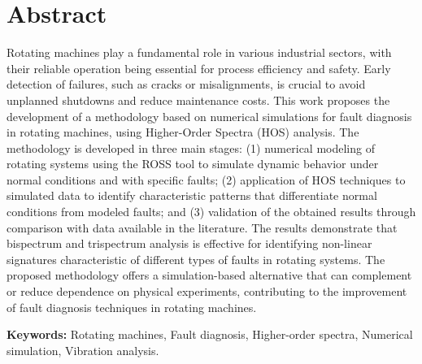 
\chapter*{Abstract}

Rotating machines play a fundamental role in various industrial sectors, with their reliable operation being essential for process efficiency and safety. Early detection of failures, such as cracks or misalignments, is crucial to avoid unplanned shutdowns and reduce maintenance costs. This work proposes the development of a methodology based on numerical simulations for fault diagnosis in rotating machines, using Higher-Order Spectra (HOS) analysis. The methodology is developed in three main stages: (1) numerical modeling of rotating systems using the ROSS tool to simulate dynamic behavior under normal conditions and with specific faults; (2) application of HOS techniques to simulated data to identify characteristic patterns that differentiate normal conditions from modeled faults; and (3) validation of the obtained results through comparison with data available in the literature. The results demonstrate that bispectrum and trispectrum analysis is effective for identifying non-linear signatures characteristic of different types of faults in rotating systems. The proposed methodology offers a simulation-based alternative that can complement or reduce dependence on physical experiments, contributing to the improvement of fault diagnosis techniques in rotating machines.

\textbf{Keywords:} Rotating machines, Fault diagnosis, Higher-order spectra, Numerical simulation, Vibration analysis.

\cleardoublepage

